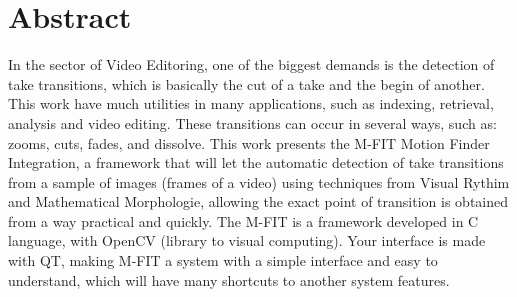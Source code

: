 \chapter*{Abstract \label{abstract}}

In the sector of Video Editoring, one of the biggest demands is the
detection of take transitions, which is basically the cut of a take
and the begin of another. This work have much utilities in many
applications, such as indexing, retrieval, analysis and video
editing. These transitions can occur in several ways, such as:
zooms, cuts, fades, and dissolve. This work presents the M-FIT
Motion Finder Integration, a framework that will let the automatic
detection of take transitions from a sample of images (frames of a
video) using techniques from Visual Rythim and Mathematical
Morphologie, allowing the exact point of transition is obtained from
a way practical and quickly. The M-FIT is a framework developed in C
language, with OpenCV (library to visual computing). Your interface
is made with QT, making M-FIT a system with a simple interface and
easy to understand, which will have many shortcuts to another system
features.
